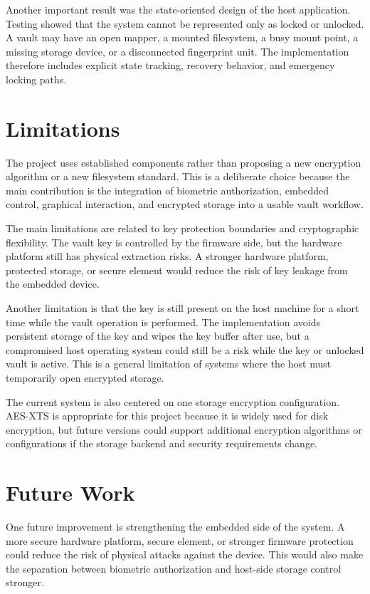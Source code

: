Another important result was the state-oriented design of the host application. Testing showed that the system cannot be represented only as locked or unlocked. A vault may have an open mapper, a mounted filesystem, a busy mount point, a missing storage device, or a disconnected fingerprint unit. The implementation therefore includes explicit state tracking, recovery behavior, and emergency locking paths.

\section{Limitations}

The project uses established components rather than proposing a new encryption algorithm or a new filesystem standard. This is a deliberate choice because the main contribution is the integration of biometric authorization, embedded control, graphical interaction, and encrypted storage into a usable vault workflow.

The main limitations are related to key protection boundaries and cryptographic flexibility. The vault key is controlled by the firmware side, but the hardware platform still has physical extraction risks. A stronger hardware platform, protected storage, or secure element would reduce the risk of key leakage from the embedded device.

Another limitation is that the key is still present on the host machine for a short time while the vault operation is performed. The implementation avoids persistent storage of the key and wipes the key buffer after use, but a compromised host operating system could still be a risk while the key or unlocked vault is active. This is a general limitation of systems where the host must temporarily open encrypted storage.

The current system is also centered on one storage encryption configuration. AES-XTS is appropriate for this project because it is widely used for disk encryption, but future versions could support additional encryption algorithms or configurations if the storage backend and security requirements change.

\section{Future Work}

One future improvement is strengthening the embedded side of the system. A more secure hardware platform, secure element, or stronger firmware protection could reduce the risk of physical attacks against the device. This would also make the separation between biometric authorization and host-side storage control stronger.

